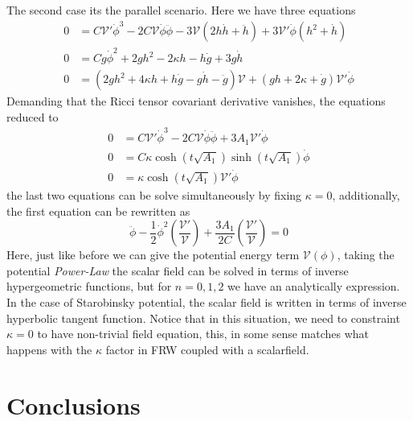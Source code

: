 \documentclass[10pt,a4paper]{article}
\begin{document}
The second case its the parallel scenario. Here we have three equations
\begin{align}
  0 & = C\mathcal{V}'\dot{\phi}^3-2C\mathcal{V}\dot{\phi}\ddot{\phi} - 3\mathcal{V}\left(2h\dot{h} + \ddot{h}\right) + 3\mathcal{V}'\dot{\phi}
  \left(h^{2} + \dot{h}\right) \\
  0 & = Cg\dot{\phi}^2 + 2gh^2 - 2\kappa h - h\dot{g} + 3g\dot{h} \\
  0 & = \left(2gh^2 + 4\kappa h +h\dot{g} - g \dot{h} - \ddot{g}\right)\mathcal{V} + \left(gh + 2\kappa + \dot{g}\right)\mathcal{V}'\dot{\phi}
\end{align}
Demanding that the Ricci tensor covariant derivative vanishes, the equations reduced to
\begin{align}
  0 & = C\mathcal{V}'\dot{\phi}^3 - 2C\mathcal{V}\dot{\phi}\ddot{\phi} + 3A_1 \mathcal{V}'\dot{\phi}\\
  0 & = C\kappa \cosh(t\sqrt{A_1})\sinh(t\sqrt{A_1})\dot{\phi} \\
  0 & = \kappa \cosh(t\sqrt{A_1})\mathcal{V}'\dot{\phi}
\end{align}
the last two equations can be solve simultaneously by fixing $\kappa = 0$, additionally, the first equation can be rewritten as
\begin{equation}
  \ddot{\phi} - \frac{1}{2}\dot{\phi}^2\left(\frac{\mathcal{V}'}{\mathcal{V}}\right) + \frac{3A_1}{2C}\left(\frac{\mathcal{V}'}{\mathcal{V}}\right) = 0
\end{equation}
Here, just like before we can give the potential energy term $\mathcal{V}(\phi)$, taking the potential \textit{Power-Law} the scalar field
can be solved in terms of inverse hypergeometric functions, but for $n = 0 , 1 , 2$ we have an analytically expression. In the case of Starobinsky
potential, the scalar field is written in terms of inverse hyperbolic tangent function. Notice that in this situation, we need to constraint $\kappa = 0$ to have non-trivial field equation, this, in some sense matches what
happens with the $\kappa$ factor in FRW coupled with a scalarfield. 



\section{Conclusions}
\end{document}
